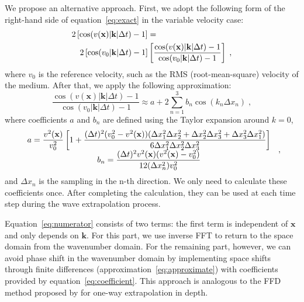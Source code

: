 We propose an alternative approach.
First, we adopt the following form of the right-hand side of equation~\ref{eq:exact} in the variable velocity case: 
\begin{eqnarray}
\label{eq:numerator}
\lefteqn{2\left[\cos(v(\mathbf{x})|\mathbf{k}|\Delta t)-1\right] = }\nonumber \\
& & 2\left[\cos(v_0|\mathbf{k}|\Delta t)-1\right]\left[\frac{\cos(v(\mathbf{x})|\mathbf{k}|\Delta t)-1}{\cos(v_0|\mathbf{k}|\Delta t)-1}\right]\;,
\end{eqnarray} 
where $v_0$ is the reference velocity, such as the RMS (root-mean-square) velocity of the medium.
After that, we apply the following approximation:
\begin{equation}
\label{eq:approximate}
\frac{\cos(v(\mathbf{x})|\mathbf{k}|\Delta t)-1}{\cos(v_0|\mathbf{k}|\Delta t)-1} \approx a + 2\sum^3_{n=1}{b_n\cos(k_n\Delta x_n)}\;,
\end{equation} 
where coefficients $a$ and $b_n$ are defined using the Taylor expansion around $k=0$,
\begin{equation}
\label{eq:coefficient}
 {\begin{array}{*{20}c}
\displaystyle a=\frac{v^2(\mathbf{x})}{v_0^2}\left[1+\frac{(\Delta t)^2(v_0^2-v^2(\mathbf{x}))(\Delta x_1^2\Delta x_2^2+\Delta x_2^2\Delta x_3^2+\Delta x_3^2\Delta x_1^2)}{6\Delta x_1^2\Delta x_2^2\Delta x_3^2}\right] \,\\ 
\displaystyle b_n=\frac{(\Delta t)^2v^2(\mathbf{x})(v^2(\mathbf{x})-v_0^2)}{12(\Delta x_n^2)v_0^2} \, \\ 
 \end{array} }  \;, 
\end{equation}
and $\Delta x_n$ is the sampling in the n-th direction. 
We only need to calculate these coefficients once. After completing the calculation, they can be used at each time step during the wave extrapolation process.


Equation~\ref{eq:numerator} consists of two terms: the first term is independent of $\mathbf{x}$ and  only depends on $\mathbf{k}$. 
For this part, we use inverse FFT to return to the space domain from the wavenumber domain.
For the remaining part, however, we can avoid phase shift in the wavenumber domain by implementing space shifts 
through finite differences (approximation~\ref{eq:approximate}) with coefficients provided by equation~\ref{eq:coefficient}.
This approach is analogous to the FFD method proposed by \cite{ffd} for one-way extrapolation in depth.

